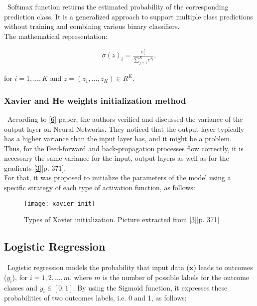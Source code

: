 \quad \, Softmax function returns the estimated probability of the corresponding prediction class. It is a generalized approach to support multiple class predictions without training and combining various binary classifiers.\\

The mathematical representation:

\begin{align*}
\sigma(z)_i = \frac{e^z_i}{\sum_{j=1}^{K} e^{z_j}},
\end{align*}

\noindent for $i=1, ..., K$ and $z=(z_1, ..., z_K) \in R^K$.

\subsubsection{Xavier and He weights initialization method}
\label{chap:Xavier and He weights initialization method}

\quad \, According to \hyperref[Bib:XavierHe]{[6]} paper, the authors verified and discussed the variance of the output layer on Neural Networks. They noticed that the output layer typically has a higher variance than the input layer has, and it might be a problem.\\

Thus, for the Feed-forward and back-propagation processes flow correctly, it is necessary the same variance for the input, output layers as well as for the gradients \hyperref[Bib:Hands-on Machine Learning]{[3]}[p. 371].\\

For that, it was proposed to initialize the parameters of the model using a specific strategy of each type of activation function, as follows:

\begin{figure}[H]
\label{fig:xavier}
\centering
\texttt{[image: xavier\_init]}
\caption{Types of Xavier initialization. Picture extracted from \hyperref[Bib:Hands-on Machine Learning]{[3]}[p. 371]}
\end{figure}


\subsection{Logistic Regression}
\label{chap:Logistic Regression}

\quad \, Logistic regression models the probability that input data ($\textbf{x}$) leads to outcomes ($y_i$), for $i=1, 2, ..., m$, where $m$ is the number of possible labels for the outcome classes and $y_i \in [0, 1]$. By using the Sigmoid function, it expresses these probabilities of two outcomes labels, i.e. 0 and 1, as follows:

